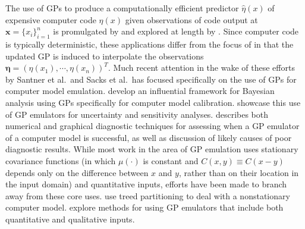 \documentclass{article}
\begin{document}
The use of GPs to produce a computationally efficient predictor $\hat \eta (x)$ of expensive computer code $\eta(x)$ given observations of code output at $\mathbf x=\{x_i\}_{i=1}^n$ is promulgated by \cite{Sacks1989} and explored at length by \cite{Santner2003a}. Since computer code is typically deterministic, these applications differ from the focus of \cite{OHagan1978} in that the updated GP is induced to interpolate the observations $\boldsymbol \eta = (\eta(x_1),\cdots,\eta(x_n))^T$. Much recent attention in the wake of these efforts by Santner et al.\ and Sacks et al.\  has focused specifically on the use of GPs for computer model emulation.
\cite{Kennedy2001} develop an influential framework for Bayesian analysis using GPs specifically for computer model calibration. \cite{Kennedy2006} showcase this use of GP emulators for uncertainty and sensitivity analyses. \cite{Bastos2009} describes both numerical and graphical diagnostic techniques for assessing when a GP emulator of a computer model is successful, as well as discussion of likely causes of poor diagnostic results. While most work in the area of GP emulation uses stationary covariance functions (in which $\mu(\cdot)$ is constant and $C(x,y)\equiv C(x-y)$ depends only on the difference between $x$ and $y$, rather than on their location in the input domain) and quantitative inputs, efforts have been made to branch away from these core uses. \cite{Gramacy2008} use treed partitioning to deal with a nonstationary computer model. \cite{Qian2008} explore methods for using GP emulators that include both quantitative and qualitative inputs.
\end{document}
